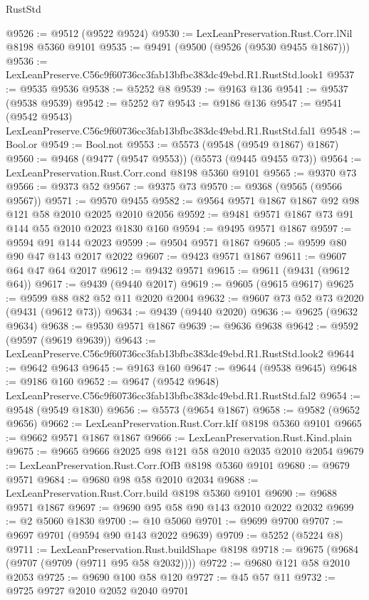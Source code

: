 \begin{lexlean}{RustStd}
\begin{coremodule}
@9526 := @9512 (@9522 @9524)
@9530 := LexLeanPreservation.Rust.Corr.lNil @8198 @5360 @9101
@9535 := @9491 (@9500 (@9526 (@9530 @9455 @1867)))
@9536 := LexLeanPreserve.C56c9f60736cc3fab13bfbc383dc49ebd.R1.RustStd.look1
@9537 := @9535 @9536
@9538 := @5252 @8
@9539 := @9163 @136
@9541 := @9537 (@9538 @9539)
@9542 := @5252 @7
@9543 := @9186 @136
@9547 := @9541 (@9542 @9543) LexLeanPreserve.C56c9f60736cc3fab13bfbc383dc49ebd.R1.RustStd.fal1
@9548 := Bool.or
@9549 := Bool.not
@9553 := @5573 (@9548 (@9549 @1867) @1867)
@9560 := @9468 (@9477 (@9547 @9553)) (@5573 (@9445 @9455 @73))
@9564 := LexLeanPreservation.Rust.Corr.cond @8198 @5360 @9101
@9565 := @9370 @73
@9566 := @9373 @52
@9567 := @9375 @73
@9570 := @9368 (@9565 (@9566 @9567))
@9571 := @9570 @9455
@9582 := @9564 @9571 @1867 @1867 @92 @98 @121 @58 @2010 @2025 @2010 @2056
@9592 := @9481 @9571 @1867 @73 @91 @144 @55 @2010 @2023 @1830 @160
@9594 := @9495 @9571 @1867
@9597 := @9594 @91 @144 @2023
@9599 := @9504 @9571 @1867
@9605 := @9599 @80 @90 @47 @143 @2017 @2022
@9607 := @9423 @9571 @1867
@9611 := @9607 @64 @47 @64 @2017
@9612 := @9432 @9571
@9615 := @9611 (@9431 (@9612 @64))
@9617 := @9439 (@9440 @2017)
@9619 := @9605 (@9615 @9617)
@9625 := @9599 @88 @82 @52 @11 @2020 @2004
@9632 := @9607 @73 @52 @73 @2020 (@9431 (@9612 @73))
@9634 := @9439 (@9440 @2020)
@9636 := @9625 (@9632 @9634)
@9638 := @9530 @9571 @1867
@9639 := @9636 @9638
@9642 := @9592 (@9597 (@9619 @9639))
@9643 := LexLeanPreserve.C56c9f60736cc3fab13bfbc383dc49ebd.R1.RustStd.look2
@9644 := @9642 @9643
@9645 := @9163 @160
@9647 := @9644 (@9538 @9645)
@9648 := @9186 @160
@9652 := @9647 (@9542 @9648) LexLeanPreserve.C56c9f60736cc3fab13bfbc383dc49ebd.R1.RustStd.fal2
@9654 := @9548 (@9549 @1830)
@9656 := @5573 (@9654 @1867)
@9658 := @9582 (@9652 @9656)
@9662 := LexLeanPreservation.Rust.Corr.kIf @8198 @5360 @9101
@9665 := @9662 @9571 @1867 @1867
@9666 := LexLeanPreservation.Rust.Kind.plain
@9675 := @9665 @9666 @2025 @98 @121 @58 @2010 @2035 @2010 @2054
@9679 := LexLeanPreservation.Rust.Corr.fOfB @8198 @5360 @9101
@9680 := @9679 @9571
@9684 := @9680 @98 @58 @2010 @2034
@9688 := LexLeanPreservation.Rust.Corr.build @8198 @5360 @9101
@9690 := @9688 @9571 @1867
@9697 := @9690 @95 @58 @90 @143 @2010 @2022 @2032
@9699 := @2 @5060 @1830
@9700 := @10 @5060
@9701 := @9699 @9700
@9707 := @9697 @9701 (@9594 @90 @143 @2022 @9639)
@9709 := @5252 (@5224 @8)
@9711 := LexLeanPreservation.Rust.buildShape @8198
@9718 := @9675 (@9684 (@9707 (@9709 (@9711 @95 @58 @2032))))
@9722 := @9680 @121 @58 @2010 @2053
@9725 := @9690 @100 @58 @120
@9727 := @45 @57 @11
@9732 := @9725 @9727 @2010 @2052 @2040 @9701

\end{coremodule}
\end{lexlean}
